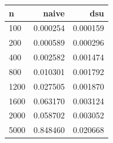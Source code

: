 \begin{tabular}{lrr}
\hline
n & naive & dsu \\
\hline
100 & 0.000254 & 0.000159 \\
200 & 0.000589 & 0.000296 \\
400 & 0.002582 & 0.001474 \\
800 & 0.010301 & 0.001792 \\
1200 & 0.027505 & 0.001870 \\
1600 & 0.063170 & 0.003124 \\
2000 & 0.058702 & 0.003052 \\
5000 & 0.848460 & 0.020668 \\
\hline
\end{tabular}
